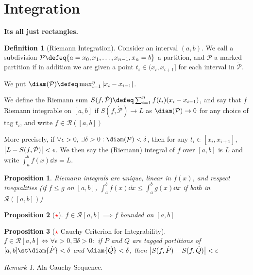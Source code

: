 \documentclass[12pt, oneside]{article}
\newcommand*{\important}{\textcolor{red}{$\star$} }
\theoremstyle{definition}
\newtheorem{defn}{Definition}
\theoremstyle{plain}
\newtheorem{prop}{Proposition}
\theoremstyle{remark}
\newtheorem{remark}{Remark}
\let\origsection=\section
\renewcommand\section[1]{\origsection{#1}\label{sec:\thesection}}
\begin{document}
\section{Integration}

\textbf{Its all just rectangles.}
\newcommand{\PP}{\mathcal{P}}
\newcommand{\RR}{\mathcal{R}}

\begin{defn}[Riemann Integration]
  Consider an interval $(a, b)$. We call a subdivision $\PP \defeq \{a = x_0, x_1, \dots, x_{n-1}, x_n = b\}$ a partition, and $\dot{\PP}$ a marked partition if in addition we are given a point $t_i \in (x_i, x_{i+1}]$ for each interval in $\dot{\PP}$.

  We put $\diam(\PP) \defeq \max_{i=1}^n \abs{x_i - x_{i-1}}$.

  We define the Riemann sum $S(f, \dot{\PP}) \defeq \sum_{i=1}^n f(t_i) (x_i - x_{i-1})$, and say that $f$ Riemann integrable on $[a, b]$ if $S(f, \dot{\PP}) \to L$ as $\diam(\dot{\PP}) \to 0$ for any choice of tag $t_i$, and write $f \in \RR([a, b])$

  More precisely, if $\forall \epsilon > 0$, $\exists \delta > 0 : \diam(\PP) < \delta$, then for any $t_i \in [x_i, x_{i+1}]$, $\abs{L - S(f, \dot{\PP})} < \epsilon$. We then say the (Riemann) integral of $f$ over $[a, b]$ is $L$ and write $\int_a^b f(x) \dd{x} = L$.
\end{defn}

\begin{prop}
  Riemann integrals are unique, linear in $f(x)$, and respect inequalities (if $f \leq g$ on $[a, b]$, $\int_a^b f(x) \dd{x} \leq \int_a^b g(x) \dd{x}$ if both in $\RR([a, b])$)
\end{prop}

\begin{prop}[\textcolor{red}{$\star$}]
  $f \in \RR[a, b] \implies f$ bounded on $[a, b]$
\end{prop}

\begin{prop}[\important Cauchy Criterion for Integrability]
  $f \in \mathcal{R}[a, b] \iff \forall \epsilon > 0, \exists \delta > 0 : $ if $\dot{P}$ and $\dot{Q}$ are tagged partitions of $[a, b] \st \diam{\dot{P}} < \delta$ and $\diam{\dot{Q}} < \delta$, then $\abs{S(f, \dot{P}) - S(f, \dot{Q})} < \epsilon$
\end{prop}

\begin{remark}
  Ala Cauchy Sequence.
\end{remark}
\end{document}
